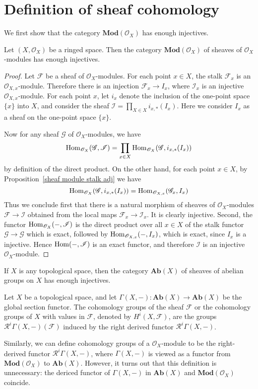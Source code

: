 \section{Definition of sheaf cohomology}
We first show that the category $\mathbf{Mod}(\mathscr{O}_X)$ has enough injectives.
\begin{proposition}
Let $(X,\mathscr{O}_X)$ be a ringed space. Then the category $\mathbf{Mod}(\mathscr{O}_X)$ of sheaves of $\mathscr{O}_X$-modules has enough injectives.
\end{proposition}
\begin{proof}
Let $\mathscr{F}$ be a sheaf of $\mathscr{O}_X$-modules. For each point $x\in X$, the stalk $\mathscr{F}_x$ is an $\mathscr{O}_{X,x}$-module. Therefore there is an injection $\mathscr{F}_x\to I_x$, where $\mathscr{I}_x$ is an injective $\mathscr{O}_{X,x}$-module. For each point $x$, let $i_x$ denote the inclusion of the one-point space $\{x\}$ into $X$, and consider the sheaf $\mathscr{I}=\prod_{X\in X}i_{x,*}(I_x)$. Here we consider $I_x$ as a sheaf on the one-point space $\{x\}$.\par
Now for any sheaf $\mathscr{G}$ of $\mathscr{O}_X$-modules, we have
\[\mathrm{Hom}_{\mathscr{O}_{X}}(\mathscr{G},\mathscr{I})=\prod_{x\in X}\mathrm{Hom}_{\mathscr{O}_{X}}(\mathscr{G},i_{x,*}(I_x))\] 
by definition of the direct product. On the other hand, for each point $x\in X$, by Proposition~\ref{sheaf module stalk adj} we have
\[\mathrm{Hom}_{\mathscr{O}_{X}}(\mathscr{G},i_{x,*}(I_x))=\mathrm{Hom}_{\mathscr{O}_{X,x}}(\mathscr{G}_x,I_x)\]
Thus we conclude first that there is a natural morphism of sheaves of $\mathscr{O}_X$-modules $\mathscr{F}\to\mathscr{I}$ obtained from the local maps $\mathscr{F}_x\to\mathscr{I}_x$. It is clearly injective. Second, the functor $\mathrm{Hom}_{\mathscr{O}_{X}}(-,\mathscr{I})$ is the direct product over all $x\in X$ of the stalk functor $\mathscr{G}\to\mathscr{G}$ which is exact, followed by $\mathrm{Hom}_{\mathscr{O}_{X,x}}(-,I_x)$, which is exact, since $I_x$ is a injective. Hence $\mathrm{Hom}(-,\mathscr{I})$ is an exact functor, and therefore $\mathscr{I}$ is an injective $\mathscr{O}_X$-module.
\end{proof}
\begin{corollary}
If $X$ is any topological space, then the category $\mathbf{Ab}(X)$ of sheaves of abelian groups on $X$ has enough injectives.
\end{corollary}
\begin{definition}
Let $X$ be a topological space, and let $\Gamma(X,-):\mathbf{Ab}(X)\to\mathbf{Ab}(X)$ be the global section functor. The cohomology groups of the sheaf $\mathscr{F}$ or the cohomology groups of $X$ with values in $\mathscr{F}$, denoted by $H^i(X,\mathscr{F})$, are the groups $\mathcal{R}^i\Gamma(X,-)(\mathscr{F})$ induced by the right derived functor $\mathcal{R}^i\Gamma(X,-)$.
\end{definition}
Similarly, we can define cohomology groups of a $\mathscr{O}_X$-module to be the right-derived functor $\mathcal{R}^i\Gamma(X,-)$, where $\Gamma(X,-)$ is viewed as a functor from $\mathbf{Mod}(\mathcal{O}_X)$ to $\mathbf{Ab}(X)$. However, it turns out that this definition is unnecessary: the dericed functor of $\Gamma(X,-)$ in $\mathbf{Ab}(X)$ and $\mathbf{Mod}(\mathscr{O}_X)$ coincide.
